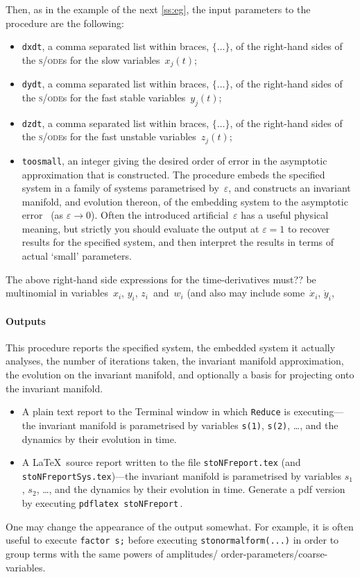 \documentclass[11pt,a5paper]{article}
\def\eps{\varepsilon}
\def\sde{\textsc{s/ode}}
\begin{document}
Then, as in the example of the next \cref{ss:eg}, the input
parameters to the procedure are the following:
\begin{itemize}
\item \verb|dxdt|, a comma separated list within braces,
\(\{\ldots\}\), of the right-hand sides of the \sde{}s for
the slow variables~\(x_j(t)\);

\item \verb|dydt|, a comma separated list within braces,
\(\{\ldots\}\), of the right-hand sides of the \sde{}s for
the fast stable variables~\(y_j(t)\);

\item \verb|dzdt|, a comma separated list within braces,
\(\{\ldots\}\), of the right-hand sides of the \sde{}s for
the fast unstable variables~\(z_j(t)\);

\item \verb|toosmall|, an integer giving the desired order
of error in the asymptotic approximation that is
constructed.  The procedure embeds the specified system in a
family of systems parametrised by~\(\eps\), and constructs
an invariant manifold, and evolution thereon, of the
embedding system to the asymptotic error~\Ord{\eps^{\tt
toosmall}} (as \(\eps\to0\)). Often the introduced
artificial~\(\eps\) has a useful physical meaning, but
strictly you should evaluate the output at \(\eps=1\) to
recover results for the specified system, and then interpret
the results in terms of actual `small' parameters.
\end{itemize}

The above right-hand side expressions for the
time-derivatives must?? be multinomial in variables~$x_i$,
$y_i$, $z_i$~and~$w_i$ (and also may include some~\(\dot
x_i\), \(\dot y_i\), 


\paragraph{Outputs}  This procedure reports the specified
system, the embedded system it actually analyses, the number
of iterations taken, the invariant manifold approximation,
the evolution on the invariant manifold, and optionally a
basis for projecting onto the invariant manifold.
\begin{itemize}
\item A plain text report to the Terminal window in which
\verb|Reduce| is executing---the invariant manifold is
parametrised by variables \verb|s(1)|, \verb|s(2)|, \ldots,
and the dynamics by their evolution in time.
\item A \LaTeX\ source report written to the file
\verb|stoNFreport.tex| (and
\verb|stoNFreportSys.tex|)---the invariant manifold is
parametrised by variables \(s_1\), \(s_2\), \ldots, and the
dynamics by their evolution in time.  Generate a pdf version
by executing \verb|pdflatex stoNFreport|\,.
\end{itemize}
One may change the appearance of the output somewhat. For
example, it is often useful to execute  \verb|factor s;|
before executing \verb|stonormalform(...)| in order to
group terms with the same powers of amplitudes\slash
order-parameters\slash coarse-variables.
\end{document}
